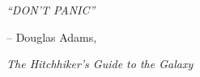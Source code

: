\vspace*{5cm}


\begin{flushright}\large

\textit{``DON'T PANIC''}



\bigskip\bigskip\bigskip


\small -- Douglas Adams,

\textit{The Hitchhiker's Guide to the Galaxy}
\end{flushright}
\normalfont
\cleardoublepage